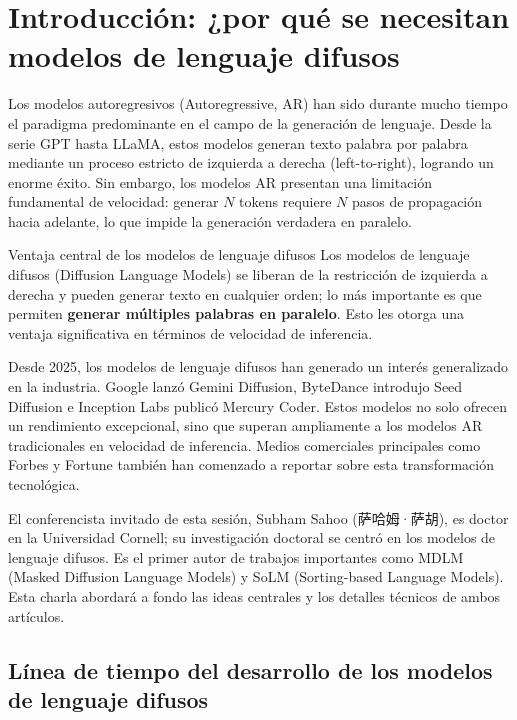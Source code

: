 \section{Introducción: ¿por qué se necesitan modelos de lenguaje difusos}

Los modelos autoregresivos (Autoregressive, AR) han sido durante mucho tiempo el paradigma predominante en el campo de la generación de lenguaje. Desde la serie GPT hasta LLaMA, estos modelos generan texto palabra por palabra mediante un proceso estricto de izquierda a derecha (left-to-right), logrando un enorme éxito. Sin embargo, los modelos AR presentan una limitación fundamental de velocidad: generar $N$ tokens requiere $N$ pasos de propagación hacia adelante, lo que impide la generación verdadera en paralelo.

\begin{importantbox}{Ventaja central de los modelos de lenguaje difusos}
Los modelos de lenguaje difusos (Diffusion Language Models) se liberan de la restricción de izquierda a derecha y pueden generar texto en cualquier orden; lo más importante es que permiten \textbf{generar múltiples palabras en paralelo}. Esto les otorga una ventaja significativa en términos de velocidad de inferencia.
\end{importantbox}

Desde 2025, los modelos de lenguaje difusos han generado un interés generalizado en la industria. Google lanzó Gemini Diffusion, ByteDance introdujo Seed Diffusion e Inception Labs publicó Mercury Coder. Estos modelos no solo ofrecen un rendimiento excepcional, sino que superan ampliamente a los modelos AR tradicionales en velocidad de inferencia. Medios comerciales principales como Forbes y Fortune también han comenzado a reportar sobre esta transformación tecnológica.

El conferencista invitado de esta sesión, Subham Sahoo (萨哈姆·萨胡), es doctor en la Universidad Cornell; su investigación doctoral se centró en los modelos de lenguaje difusos. Es el primer autor de trabajos importantes como MDLM (Masked Diffusion Language Models) y SoLM (Sorting-based Language Models). Esta charla abordará a fondo las ideas centrales y los detalles técnicos de ambos artículos.

\subsection{Línea de tiempo del desarrollo de los modelos de lenguaje difusos}

